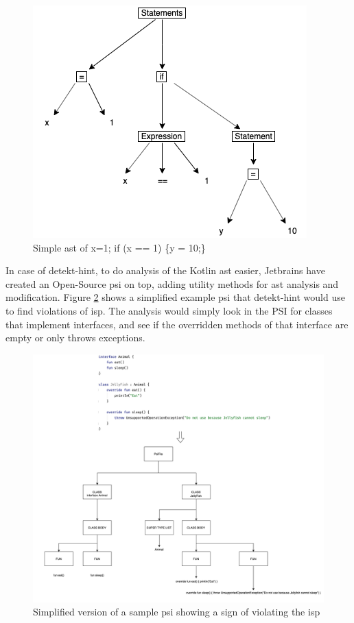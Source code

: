 \documentclass{report}
\begin{document}
\begin{figure}[h!]
	\centering
	\includegraphics[width=\linewidth/2]{report/images/ast.png}
	\caption{Simple \gls{ast} of x=1; if (x == 1) \{y = 10;\}}
	\label{fig:ast}
\end{figure}

In case of detekt-hint, to do analysis of the Kotlin \gls{ast} easier, Jetbrains\cite{jetbrains} have created an Open-Source \gls{psi} on top, adding utility methods for \gls{ast} analysis and modification. Figure \ref{fig:psi} shows a simplified example \gls{psi} that detekt-hint would use to find violations of \gls{isp}. The analysis would simply look in the PSI for classes that implement interfaces, and see if the overridden methods of that interface are empty or only throws exceptions. 

\begin{figure}[h!]
    \centering
    \includegraphics[width=\linewidth]{report/images/psi.png}
    \caption{Simplified version of a sample \gls{psi} showing a sign of violating the \gls{isp}}
    \label{fig:psi}
\end{figure}
\end{document}
